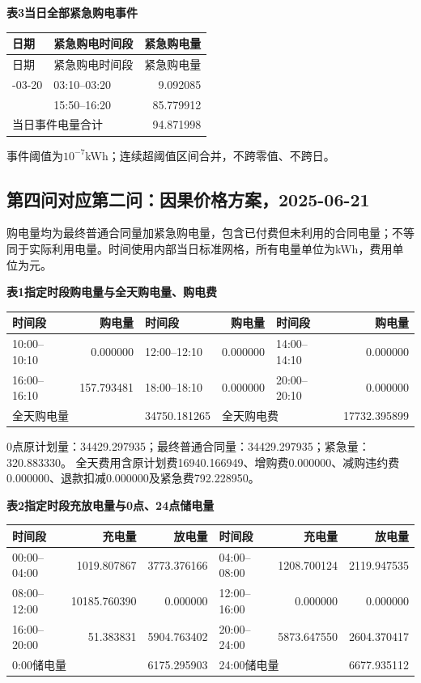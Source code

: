 \begin{center}\textbf{表3\quad 当日全部紧急购电事件}\end{center}
\begin{longtable}{llr}\toprule 日期 & 紧急购电时间段 & 紧急购电量\\\midrule\endfirsthead
\toprule 日期 & 紧急购电时间段 & 紧急购电量\\\midrule\endhead
\bottomrule\endfoot
2025-03-20 & 03:10--03:20 & 9.092085\\
 & 15:50--16:20 & 85.779912\\
\midrule\multicolumn{2}{l}{当日事件电量合计} & 94.871998\\
\end{longtable}
\noindent 事件阈值为$10^{-7}$kWh；连续超阈值区间合并，不跨零值、不跨日。
\endgroup
\clearpage
\subsection{第四问对应第二问：因果价格方案，2025-06-21}
\begingroup\small
\setlength{\tabcolsep}{4pt}\renewcommand{\arraystretch}{1.08}
\setlength{\LTpre}{4pt}\setlength{\LTpost}{4pt}
\noindent 购电量均为最终普通合同量加紧急购电量，包含已付费但未利用的合同电量；不等同于实际利用电量。时间使用内部当日标准网格，所有电量单位为kWh，费用单位为元。
\begin{center}\textbf{表1\quad 指定时段购电量与全天购电量、购电费}\par\smallskip
\begin{tabular}{lr lr lr}\toprule
时间段 & 购电量 & 时间段 & 购电量 & 时间段 & 购电量\\\midrule
10:00--10:10 & 0.000000 & 12:00--12:10 & 0.000000 & 14:00--14:10 & 0.000000\\
16:00--16:10 & 157.793481 & 18:00--18:10 & 0.000000 & 20:00--20:10 & 0.000000\\
\midrule
\multicolumn{2}{l}{全天购电量} & 34750.181265 & \multicolumn{2}{l}{全天购电费} & 17732.395899\\
\bottomrule\end{tabular}\end{center}
\noindent 0点原计划量：34429.297935；最终普通合同量：34429.297935；紧急量：320.883330。
全天费用含原计划费16940.166949、增购费0.000000、减购违约费0.000000、退款扣减0.000000及紧急费792.228950。
\begin{center}\textbf{表2\quad 指定时段充放电量与0点、24点储电量}\par\smallskip
\begin{tabular}{lrr lrr}\toprule
时间段 & 充电量 & 放电量 & 时间段 & 充电量 & 放电量\\\midrule
00:00--04:00 & 1019.807867 & 3773.376166 & 04:00--08:00 & 1208.700124 & 2119.947535\\
08:00--12:00 & 10185.760390 & 0.000000 & 12:00--16:00 & 0.000000 & 0.000000\\
16:00--20:00 & 51.383831 & 5904.763402 & 20:00--24:00 & 5873.647550 & 2604.370417\\
\midrule
\multicolumn{2}{l}{0:00储电量} & 6175.295903 & \multicolumn{2}{l}{24:00储电量} & 6677.935112\\
\bottomrule\end{tabular}\end{center}
